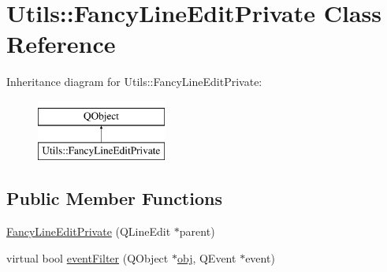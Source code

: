 \hypertarget{class_utils_1_1_fancy_line_edit_private}{\section{Utils\-:\-:Fancy\-Line\-Edit\-Private Class Reference}
\label{class_utils_1_1_fancy_line_edit_private}
}
Inheritance diagram for Utils\-:\-:Fancy\-Line\-Edit\-Private\-:\begin{figure}[H]
\begin{center}
\leavevmode
\includegraphics[height=2.000000cm]{class_utils_1_1_fancy_line_edit_private}
\end{center}
\end{figure}
\subsection*{Public Member Functions}
\begin{DoxyCompactItemize}
\item 
\hyperlink{class_utils_1_1_fancy_line_edit_private_af49fb87ff7f87da0007164d98cf19b4f}{Fancy\-Line\-Edit\-Private} (Q\-Line\-Edit $\ast$parent)
\item 
virtual bool \hyperlink{class_utils_1_1_fancy_line_edit_private_a913ad07243b3e212d5ee1a55e47d080d}{event\-Filter} (Q\-Object $\ast$\hyperlink{glext_8h_a0c0d4701a6c89f4f7f0640715d27ab26}{obj}, Q\-Event $\ast$event)
\end{DoxyCompactItemize}
